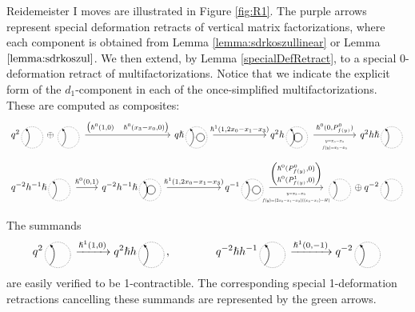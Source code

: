\documentclass{article}
\theoremstyle{plain} %
\theoremstyle{definition} %
\theoremstyle{remark} %
\begin{document}
Reidemeister I moves are illustrated in Figure \ref{fig:R1}. The purple arrows represent special deformation retracts of vertical matrix factorizations, where each component is obtained from Lemma \ref{lemma:sdrkoszullinear} or Lemma $\ref{lemma:sdrkoszul}$. We then extend, by Lemma \ref{specialDefRetract}, to a special 0-deformation retract of multifactorizations. Notice that we indicate the explicit form of the $d_1$-component in each of the once-simplified multifactorizations. These are computed as composites:
\[
\begin{tikzcd}[column sep=2cm,ampersand replacement=\&]
q^2\scalebox{0.5}{\SingleEdge{}{}}\oplus \scalebox{0.5}{\SingleEdge{}{}}   
\arrow[r, "{\begin{pmatrix} \hslash^0(1,0)&\hslash^0(x_3-x_0,0)
\end{pmatrix}}"] 
\&[1.2cm]
q\hslash\scalebox{0.5}{\ThinEdgeAndCircle{}{}{}} 
\arrow[r, "{\hslash^1(1,2x_0-x_1-x_3)}"]
\&
q^2h\scalebox{0.5}{\ThickEdgeAndCircle{}{}{}}
\arrow[r, "{\hslash^0(0,P^0_{f(y)})}", "\scalebox{0.6}{$\begin{matrix}
    y=x_3-x_0 \\ f(y)= x_3-x_0
\end{matrix}$}"']
\&[-0.4cm]
q^2h\hslash\scalebox{0.5}{\SingleEdge{}{}} 
\end{tikzcd}
\]
\[
\begin{tikzcd}[column sep=2cm, ampersand replacement=\&]
q^{-2}h^{-1}\hslash\scalebox{0.5}{\SingleEdge{}{}}  
\arrow[r, "{\hslash^0(0,1)}"] 
\&[-1.2cm]
q^{-2}h^{-1}\hslash\scalebox{0.5}{\ThickEdgeAndCircle{}{}{}}
\arrow[r, "{\hslash^1(1,2x_0-x_1-x_3)}"]
\&
q^{-1}\scalebox{0.5}{\ThinEdgeAndCircle{}{}{}} 
\arrow[r, "{\begin{pmatrix} \hslash^0(P^0_{f(y)},0) \\
\hslash^0(P^1_{f(y)},0) \end{pmatrix}}", "\scalebox{0.6}{$\begin{matrix}
    y=x_3-x_0 \\ f(y)= (2x_0-x_1-x_3)((x_3-x_1)-H)
\end{matrix}$}"']
\&
\scalebox{0.5}{\SingleEdge{}{}}\oplus q^{-2}\scalebox{0.5}{\SingleEdge{}{}}
\end{tikzcd}
\]



The summands 
$$
q^2\scalebox{0.5}{\SingleEdge{}{}}
\xrightarrow{\hslash^1(1,0)} 
q^2\hslash h\scalebox{0.5}{\SingleEdge{}{}},
\qquad \qquad 
q^{-2}\hslash h^{-1}\scalebox{0.5}{\SingleEdge{}{}}
\xrightarrow{\hslash^1(0,-1)} 
q^{-2}\scalebox{0.5}{\SingleEdge{}{}}
$$
are easily verified to be 1-contractible. The corresponding special 1-deformation retractions cancelling these summands are represented by the green arrows.
\end{document}
